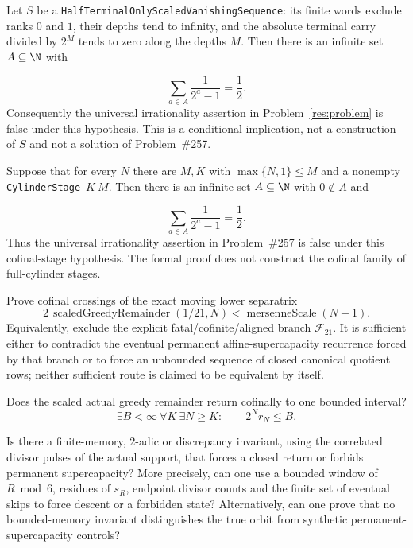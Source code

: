 \documentclass[11pt]{article}
\begin{document}
\begin{theorem}
\label{res:terminalhalf}
Let $S$ be a
\texttt{HalfTerminalOnlyScaledVanishingSequence}: its finite words exclude
ranks $0$ and $1$, their depths tend to infinity, and the absolute terminal
carry divided by $2^M$ tends to zero along the depths $M$.  Then there is an
infinite set $A\subseteq\N$ with

\[
  \sum_{a\in A}\frac1{2^a-1}=\frac12.
\]
Consequently the universal irrationality assertion in
Problem~\ref{res:problem} is false under this hypothesis.  This is a
conditional implication, not a construction of $S$ and not a solution
of Problem~\#257.
\end{theorem}

\begin{theorem}
\label{res:cylinderhalf}
Suppose that for every $N$ there are $M,K$ with
$\max\{N,1\}\le M$ and a nonempty
\texttt{CylinderStage}~$K~M$.  Then there is an infinite set
$A\subseteq\N$ with $0\notin A$ and

\[
  \sum_{a\in A}\frac{1}{2^a-1}=\frac12.
\]
Thus the universal irrationality assertion in Problem~\#257 is false under
this cofinal-stage hypothesis.  The formal proof does not construct the
cofinal family of full-cylinder stages.
\end{theorem}

\begin{problem}
\label{prob:one-over-twenty-one-membership}
Prove cofinal crossings of the exact moving lower separatrix
\[
 2\,\operatorname{scaledGreedyRemainder}(1/21,N)
 <\operatorname{mersenneScale}(N+1).
\]
Equivalently, exclude the explicit fatal/cofinite/aligned branch $\mathcal F_{21}$.
It is sufficient either to contradict the eventual permanent
affine-supercapacity recurrence forced by that branch or to force an unbounded
sequence of closed canonical quotient rows; neither sufficient route is
claimed to be equivalent by itself.
\end{problem}

\begin{problem}\label{prob:scaled-return}
Does the scaled actual greedy remainder return cofinally to one bounded
interval?
\[
 \exists B<\infty\ \forall K\ \exists N\ge K:
 \qquad 2^N r_N\le B.
\]
\end{problem}

\begin{problem}\label{prob:actual-invariant}
Is there a finite-memory, $2$-adic or discrepancy invariant, using the
correlated divisor pulses of the actual support, that forces a closed return
or forbids permanent supercapacity?  More precisely, can one use a bounded
window of $R\bmod6$, residues of $s_R$, endpoint divisor counts and the finite
set of eventual skips to force descent or a forbidden state?  Alternatively,
can one prove that no bounded-memory invariant distinguishes the true orbit
from synthetic permanent-supercapacity controls?
\end{problem}
\end{document}
